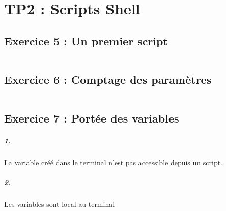 \chapter{TP2 : Scripts Shell}
    \section{Exercice 5 : Un premier script}
        \inputminted{bash}{../TP1-TP2/TP2/ex5.sh}
    \section{Exercice 6 : Comptage des paramètres}
        \inputminted{bash}{../TP1-TP2/TP2/ex6.sh}
    \section{Exercice 7 : Portée des variables}
        \paragraph{1.}
            La variable créé dans le terminal n'est pas accessible depuis un script.
        \paragraph{2.}
            Les variables sont local au terminal

